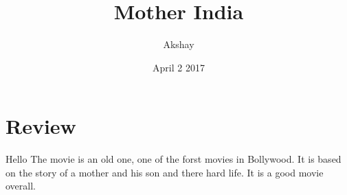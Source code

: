 \documentclass{article}
\title{Mother India}
\author{Akshay}
\date{April 2 2017}
\begin{document}
\maketitle
\section{Review}
Hello
The movie is an old one, one of the forst movies in Bollywood. It is based on the story of a mother and his son and there hard life. It is a good movie overall.
\end{document}
